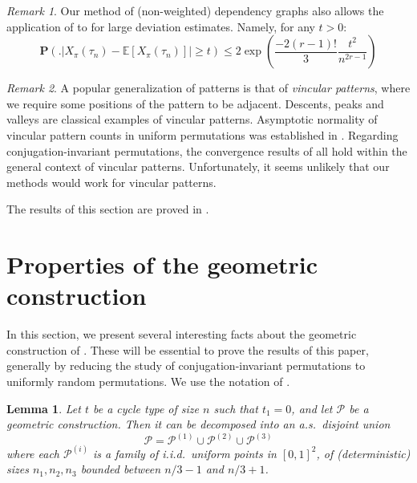\documentclass{article}
\newtheorem{lem}[theorem]{Lemma}
\theoremstyle{remark}
\newtheorem{rem}{Remark}
\def\m{\!-\!}
\def\p{\!+\!}
\newcommand{\card}[1]{\left|#1\right|}
\newcommand{\mean}[1]{\mathbb{E}\left[#1\right]}
\newcommand{\prob}[1]{\mathbf{P}\left(#1\right)}
\def\carre{[0,1]^2}
\def\pts{\mathcal{P}}
\begin{document}
\begin{rem}
    Our method of (non-weighted) dependency graphs also allows the application of \cite[Theorem~2.1]{J04} to  for large deviation estimates.
    Namely, for any $t>0$:
    \begin{equation*}
        \prob{\big. \card{X_\pi(\tau_n)-\mean{X_\pi(\tau_n)}} \ge t}
        \le 2\exp\left( \frac{-2 (r-1)!}{3} \frac{t^2}{n^{2r-1}} \right)
    \end{equation*}
\end{rem}

\begin{rem}
    A popular generalization of patterns is that of {\em vincular patterns}, where we require some positions of the pattern to be adjacent.
    Descents, peaks and valleys are classical examples of vincular patterns.
    Asymptotic normality of vincular pattern counts in uniform permutations was established in \cite{H18}.
    Regarding conjugation-invariant permutations, the convergence results of \cite{FK23,HR22,K22} all hold within the general context of vincular patterns.
    Unfortunately, it seems unlikely that our methods would work for vincular patterns.
\end{rem}

The results of this section are proved in .


\section{Properties of the geometric construction}
\label{sec: prelim}

In this section, we present several interesting facts about the geometric construction of .
These will be essential to prove the results of this paper, generally by reducing the study of conjugation-invariant permutations to uniformly random permutations.
We use the notation of .

\begin{lem}\label{lem: decomposition t-cyclic}
    Let $t$ be a cycle type of size $n$ such that $t_1=0$, and let $\pts$ be a geometric construction.
    Then it can be decomposed into an a.s.~disjoint union
    $$\pts = \pts^{(1)}\cup\pts^{(2)}\cup\pts^{(3)}$$
    where each $\pts^{(i)}$ is a family of i.i.d.~uniform points in $\carre$, of (deterministic) sizes $n_1,n_2,n_3$ bounded between $n/3\m1$ and $n/3\p1$.
\end{lem}
\end{document}
